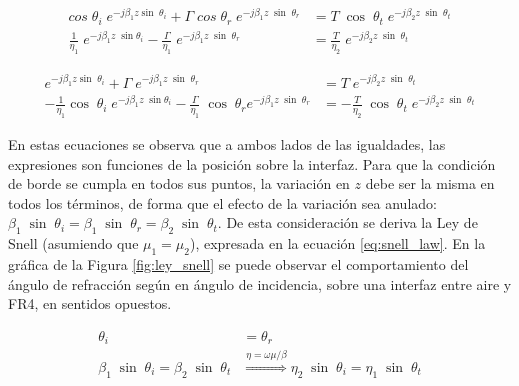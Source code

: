 \begin{equation}
	\begin{aligned}
		cos \; \theta_i \; e^{-j \beta_1 z \sin \; \theta_i} + \Gamma \; cos \; \theta_r \; e^{-j \beta_1 z \; \sin\; \theta_r} &= T\; \cos\; \theta_t \; e^{-j \beta_2 z \; \sin\; \theta_t}\\
		\frac{1}{\eta_1} \; e^{-j \beta_1 z \; \sin \theta_i} - \frac{\Gamma}{\eta_1} \; e^{-j \beta_1 z \; \sin \; \theta_r} &= \frac{T}{\eta_2} \; e^{-j \beta_2 z \; \sin\; \theta_t}
	\end{aligned}
	\label{eq:continuidad_campos_paralelo}
\end{equation}

\begin{equation}
	\begin{aligned}
		e^{-j \beta_1 z \sin \; \theta_i} + \Gamma \; e^{-j \beta_1 z \; \sin\; \theta_r} &= T\; e^{-j \beta_2 z \; \sin\; \theta_t}\\
		-\frac{1}{\eta_1} \cos\; \theta_i \; e^{-j \beta_1 z \; \sin \theta_i} - \frac{\Gamma}{\eta_1} \; \cos\; \theta_r e^{-j \beta_1 z \; \sin \; \theta_r} &= -\frac{T}{\eta_2} \; \cos\; \theta_t \; e^{-j \beta_2 z \; \sin\; \theta_t}
	\end{aligned}
	\label{eq:continuidad_campos_perpendicular}
\end{equation}

En estas ecuaciones se observa que a ambos lados de las igualdades, las expresiones son funciones de la posición sobre la interfaz. Para que la condición de borde se cumpla en todos sus puntos, la variación en $z$ debe ser la misma en todos los términos, de forma que el efecto de la variación sea anulado: $\beta_1 \; \sin\; \theta_i = \beta_1 \; \sin \; \theta_r = \beta_2 \; \sin\; \theta_t$.  De esta consideración se deriva la Ley de Snell (asumiendo que $\mu_1 = \mu_2$), expresada en la ecuación \ref{eq:snell_law}. En la gráfica de la Figura \ref{fig:ley_snell} se puede observar el comportamiento del ángulo de refracción según en ángulo de incidencia, sobre una interfaz entre aire y FR4, en sentidos opuestos.

\begin{subequations}
	\label{eq:snell_law}
	\begin{align}
	\theta_i &= \theta_r\\
	\beta_1 \; \sin\; \theta_i = \beta_2 \; \sin\; \theta_t & \overset{\eta=\omega\mu/\beta}{\Longrightarrow} \eta_2 \; \sin\; \theta_i = \eta_1 \; \sin\; \theta_t  \label{eq:snell_law_second}
	\end{align}
\end{subequations}

